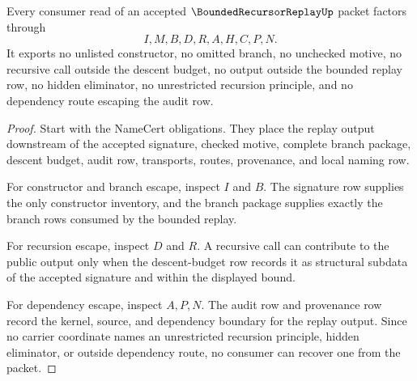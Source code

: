 \begin{theorem}
\label{thm:bounded-recursor-replay-nonescape}
Every consumer read of an accepted $\BoundedRecursorReplayUp$ packet factors through
$$
I,M,B,D,R,A,H,C,P,N.
$$
It exports no unlisted constructor, no omitted branch, no unchecked motive, no recursive call outside the descent budget, no output outside the bounded replay row, no hidden eliminator, no unrestricted recursion principle, and no dependency route escaping the audit row.
\end{theorem}
\begin{proof}
Start with the NameCert obligations. They place the replay output downstream of the accepted signature, checked motive, complete branch package, descent budget, audit row, transports, routes, provenance, and local naming row.

For constructor and branch escape, inspect $I$ and $B$. The signature row supplies the only constructor inventory, and the branch package supplies exactly the branch rows consumed by the bounded replay.

For recursion escape, inspect $D$ and $R$. A recursive call can contribute to the public output only when the descent-budget row records it as structural subdata of the accepted signature and within the displayed bound.

For dependency escape, inspect $A,P,N$. The audit row and provenance row record the kernel, source, and dependency boundary for the replay output. Since no carrier coordinate names an unrestricted recursion principle, hidden eliminator, or outside dependency route, no consumer can recover one from the packet.
\end{proof}


\begin{closurestatus}{\BoundedRecursorReplayUp}
  \theoryclosure{\seedClosure}
  \formalstatus{\unformalizedV}
\end{closurestatus}
